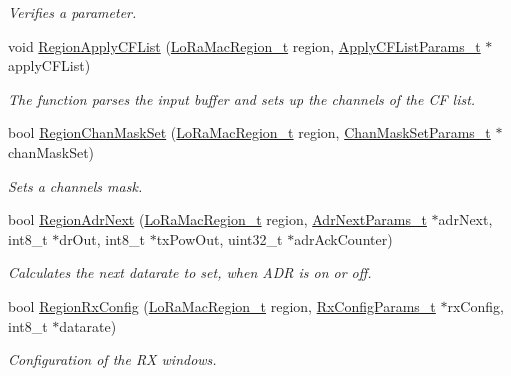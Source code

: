 \begin{DoxyCompactItemize}
\begin{DoxyCompactList}\small\item\em Verifies a parameter. \end{DoxyCompactList}\item 
void \hyperlink{group__REGION_gae3fdd82182ebb0704adb2a017d30e1f2}{Region\+Apply\+C\+F\+List} (\hyperlink{group__LORAMAC_ga80c48efda9ae02e14b58160d34a798dd}{Lo\+Ra\+Mac\+Region\+\_\+t} region, \hyperlink{group__REGION_ga71588e9ad07e34b78fa91d51881fd3c6}{Apply\+C\+F\+List\+Params\+\_\+t} $\ast$apply\+C\+F\+List)
\begin{DoxyCompactList}\small\item\em The function parses the input buffer and sets up the channels of the CF list. \end{DoxyCompactList}\item 
bool \hyperlink{group__REGION_ga795ed3c13f4c8d03e39298fd64e5b2df}{Region\+Chan\+Mask\+Set} (\hyperlink{group__LORAMAC_ga80c48efda9ae02e14b58160d34a798dd}{Lo\+Ra\+Mac\+Region\+\_\+t} region, \hyperlink{group__REGION_ga6d24f7da136006410827dfb29f6b9b9e}{Chan\+Mask\+Set\+Params\+\_\+t} $\ast$chan\+Mask\+Set)
\begin{DoxyCompactList}\small\item\em Sets a channels mask. \end{DoxyCompactList}\item 
bool \hyperlink{group__REGION_ga08cac64beeadd0555460ca5e756a0792}{Region\+Adr\+Next} (\hyperlink{group__LORAMAC_ga80c48efda9ae02e14b58160d34a798dd}{Lo\+Ra\+Mac\+Region\+\_\+t} region, \hyperlink{group__REGION_ga567c2742622326b350b4e91bbf61b4ce}{Adr\+Next\+Params\+\_\+t} $\ast$adr\+Next, int8\+\_\+t $\ast$dr\+Out, int8\+\_\+t $\ast$tx\+Pow\+Out, uint32\+\_\+t $\ast$adr\+Ack\+Counter)
\begin{DoxyCompactList}\small\item\em Calculates the next datarate to set, when A\+DR is on or off. \end{DoxyCompactList}\item 
bool \hyperlink{group__REGION_gaf89984d30239d6597190409068031465}{Region\+Rx\+Config} (\hyperlink{group__LORAMAC_ga80c48efda9ae02e14b58160d34a798dd}{Lo\+Ra\+Mac\+Region\+\_\+t} region, \hyperlink{group__REGION_ga375c038078dfcfc7ef14280021db719e}{Rx\+Config\+Params\+\_\+t} $\ast$rx\+Config, int8\+\_\+t $\ast$datarate)
\begin{DoxyCompactList}\small\item\em Configuration of the RX windows. \end{DoxyCompactList}\item 

\end{DoxyCompactItemize}
